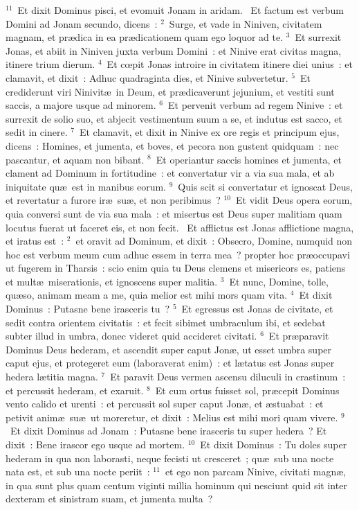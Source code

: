 ${}^{11}$~Et dixit Dominus pisci, et evomuit Jonam in aridam.
~Et factum est verbum Domini ad Jonam secundo, dicens~:
${}^{2}$~Surge, et vade in Niniven, civitatem magnam, et pr\ae dica in ea pr\ae dicationem quam ego loquor ad te.
${}^{3}$~Et surrexit Jonas, et abiit in Niniven juxta verbum Domini~: et Ninive erat civitas magna, itinere trium dierum.
${}^{4}$~Et cœpit Jonas introire in civitatem itinere diei unius~: et clamavit, et dixit~: Adhuc quadraginta dies, et Ninive subvertetur.
${}^{5}$~Et crediderunt viri Ninivit\ae\ in Deum, et pr\ae dicaverunt jejunium, et vestiti sunt saccis, a majore usque ad minorem.
${}^{6}$~Et pervenit verbum ad regem Ninive~: et surrexit de solio suo, et abjecit vestimentum suum a se, et indutus est sacco, et sedit in cinere.
${}^{7}$~Et clamavit, et dixit in Ninive ex ore regis et principum ejus, dicens~: Homines, et jumenta, et boves, et pecora non gustent quidquam~: nec pascantur, et aquam non bibant.
${}^{8}$~Et operiantur saccis homines et jumenta, et clament ad Dominum in fortitudine~: et convertatur vir a via sua mala, et ab iniquitate qu\ae\ est in manibus eorum.
${}^{9}$~Quis scit si convertatur et ignoscat Deus, et revertatur a furore ir\ae\ su\ae , et non peribimus~?
${}^{10}$~Et vidit Deus opera eorum, quia conversi sunt de via sua mala~: et misertus est Deus super malitiam quam locutus fuerat ut faceret eis, et non fecit.
~Et afflictus est Jonas afflictione magna, et iratus est~:
${}^{2}$~et oravit ad Dominum, et dixit~: Obsecro, Domine, numquid non hoc est verbum meum cum adhuc essem in terra mea~? propter hoc pr\ae occupavi ut fugerem in Tharsis~: scio enim quia tu Deus clemens et misericors es, patiens et mult\ae\ miserationis, et ignoscens super malitia.
${}^{3}$~Et nunc, Domine, tolle, qu\ae so, animam meam a me, quia melior est mihi mors quam vita.
${}^{4}$~Et dixit Dominus~: Putasne bene irasceris tu~?
${}^{5}$~Et egressus est Jonas de civitate, et sedit contra orientem civitatis~: et fecit sibimet umbraculum ibi, et sedebat subter illud in umbra, donec videret quid accideret civitati.
${}^{6}$~Et pr\ae paravit Dominus Deus hederam, et ascendit super caput Jon\ae , ut esset umbra super caput ejus, et protegeret eum (laboraverat enim)~: et l\ae tatus est Jonas super hedera l\ae titia magna.
${}^{7}$~Et paravit Deus vermen ascensu diluculi in crastinum~: et percussit hederam, et exaruit.
${}^{8}$~Et cum ortus fuisset sol, pr\ae cepit Dominus vento calido et urenti~: et percussit sol super caput Jon\ae , et \ae stuabat~: et petivit anim\ae\ su\ae\ ut moreretur, et dixit~: Melius est mihi mori quam vivere.
${}^{9}$~Et dixit Dominus ad Jonam~: Putasne bene irasceris tu super hedera~? Et dixit~: Bene irascor ego usque ad mortem.
${}^{10}$~Et dixit Dominus~: Tu doles super hederam in qua non laborasti, neque fecisti ut cresceret~; qu\ae\ sub una nocte nata est, et sub una nocte periit~:
${}^{11}$~et ego non parcam Ninive, civitati magn\ae , in qua sunt plus quam centum viginti millia hominum qui nesciunt quid sit inter dexteram et sinistram suam, et jumenta multa~?
